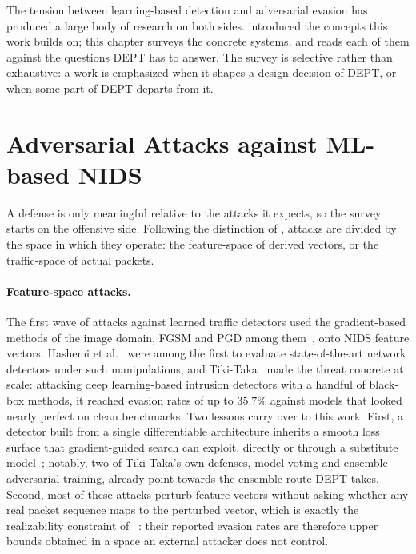 \label{chap:related}

The tension between learning-based detection and adversarial evasion has produced a
large body of research on both sides.  introduced the concepts this
work builds on; this chapter surveys the concrete systems, and reads each of them
against the questions DEPT has to answer. The survey is selective rather than
exhaustive: a work is emphasized when it shapes a design decision of DEPT, or when some
part of DEPT departs from it.

\section{Adversarial Attacks against ML-based NIDS}\label{sec:rel-attacks}
A defense is only meaningful relative to the attacks it expects, so the survey starts
on the offensive side. Following the distinction of , attacks are
divided by the space in which they operate: the feature-space of derived vectors, or
the traffic-space of actual packets.

\paragraph{Feature-space attacks.}
The first wave of attacks against learned traffic detectors used the
gradient-based methods of the image domain, \ac{FGSM} and \ac{PGD} among
them~\cite{goodfellow2014explaining,madry2018towards}, onto \ac{NIDS} feature vectors.
Hashemi et al.~\cite{hashemi2019towards} were among the first to evaluate
state-of-the-art network detectors under such manipulations, and Tiki-Taka~\cite{zhang2020tiki}
made the threat concrete at scale: attacking deep learning-based intrusion detectors
with a handful of black-box methods, it reached evasion rates of up to $35.7\%$
against models that looked nearly perfect on clean benchmarks. Two lessons carry
over to this work. First, a detector built from a single differentiable architecture
inherits a smooth loss surface that gradient-guided search can exploit, directly or
through a substitute model~\cite{papernot2017practical}; notably, two of Tiki-Taka's own
defenses, model voting and ensemble adversarial training, already
point towards the ensemble route DEPT takes. Second, most of these attacks perturb
feature vectors without asking whether any real packet sequence maps to the perturbed
vector, which is exactly the realizability constraint of
~\cite{pierazzi2020intriguing,apruzzese2023sok}: their
reported evasion rates are therefore upper bounds obtained in a space an external attacker does
not control.

